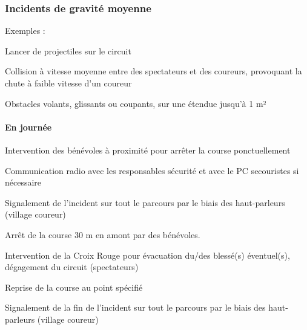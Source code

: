 \documentclass[hidelinks, paper=a4, fontsize=13pt]{report}
\begin{document}
\subsubsection{Incidents de gravité moyenne}

Exemples :
\begin{list}{•}{}
\item Lancer de projectiles sur le circuit
\item Collision à vitesse moyenne entre des spectateurs et des coureurs, provoquant la chute  à faible vitesse d’un coureur
\item Obstacles volants, glissants ou coupants, sur une étendue jusqu’à 1 m²

\end{list}

\paragraph{En journée}
\begin{list}{•}{}
\item Intervention des bénévoles à proximité pour arrêter la course ponctuellement 
\item Communication radio avec les responsables sécurité et avec le PC secouristes si nécessaire
\item Signalement de l’incident sur tout le parcours par le biais des haut-parleurs (village coureur)
\item Arrêt de la course 30 m en amont par des bénévoles.
\item Intervention de la Croix Rouge pour évacuation du/des blessé(s) éventuel(s), dégagement du circuit (spectateurs)
\item Reprise de la course au point spécifié
\item Signalement de la fin de l’incident sur tout le parcours par le biais des haut-parleurs (village coureur)
\end{list}
\end{document}
